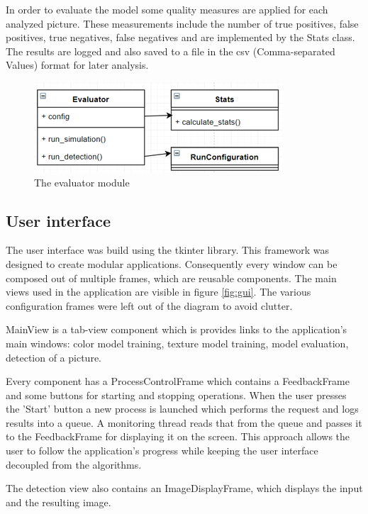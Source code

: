 \documentclass[12pt]{report}
\begin{document}
	In order to evaluate the model some quality measures are applied for each analyzed picture. These measurements include the number of true positives, false positives, true negatives, false negatives and are implemented by the Stats class. The results are logged and also saved to a file in the csv (Comma-separated Values) format for later analysis.
	
	\begin{figure}[h!]
		\centering
		\includegraphics[]{design/evaluator.png}
		\caption{The evaluator module}
		\label{fig:evaluator}
	\end{figure}
	
	\subsection{User interface}
	
	The user interface was build using the tkinter library. This framework was designed to create modular applications. Consequently every window can be composed out of multiple frames, which are reusable components. The main views used in the application are visible in figure \ref{fig:gui}. The various configuration frames were left out of the diagram to avoid clutter.
	
	MainView is a tab-view component which is provides links to the application's main windows: color model training, texture model training, model evaluation, detection of a picture.
	
	Every component has a ProcessControlFrame which contains a FeedbackFrame and some buttons for starting and stopping operations. When the user presses the 'Start' button a new process is launched which performs the request and logs results into a queue. A monitoring thread reads that from the queue and passes it to the FeedbackFrame for displaying it on the screen. This approach allows the user to follow the application's progress while keeping the user interface decoupled from the algorithms.
	
	The detection view also contains an ImageDisplayFrame, which displays the input and the resulting image.
	
\end{document}
